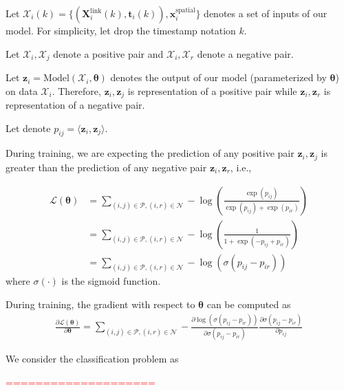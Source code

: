 Let $\mathcal{X}_i(k) = \{ (\mathbf{X}_i^\text{link}(k), \boldsymbol{t}_i(k)), \mathbf{x}_i^\text{spatial} \}$ denotes a set of inputs of our model. 
For simplicity, let drop the timestamp notation $k$.

Let $\mathcal{X}_i, \mathcal{X}_j$ denote a positive pair and $\mathcal{X}_i, \mathcal{X}_r$ denote a negative pair.

Let $\mathbf{z}_{i} = \text{Model}(\mathcal{X}_i, \boldsymbol{\theta})$ denotes the output of our model (parameterized by $\boldsymbol{\theta}$) on data $\mathcal{X}_i$. Therefore, $\mathbf{z}_i, \mathbf{z}_j$ is representation of a positive pair while $\mathbf{z}_i, \mathbf{z}_r$ is representation of a negative pair.



Let denote $p_{ij} = \langle \mathbf{z}_i, \mathbf{z}_j \rangle $.

During training, we are expecting the prediction of any positive pair $\mathbf{z}_i, \mathbf{z}_j$ is greater than the prediction of any negative pair $\mathbf{z}_i, \mathbf{z}_r$, i.e., 

\begin{equation}
    \begin{aligned}
    \mathcal{L}(\bm{\theta}) 
    &=  \sum_{(i,j)\in\mathcal{P}, (i,r) \in\mathcal{N}}  - \log\left(\frac{\exp(p_{ij})}{\exp(p_{ij}) + \exp(p_{ir})}\right) \\
    &= \sum_{(i,j)\in\mathcal{P}, (i,r) \in\mathcal{N}}  - \log\left(\frac{1}{1 + \exp(- p_{ij} + p_{ir})}\right) \\
    & = \sum_{(i,j)\in\mathcal{P}, (i,r) \in\mathcal{N}} - \log(\sigma(p_{ij}-p_{ir}))
    \end{aligned}
\end{equation}
where $\sigma(\cdot)$ is the sigmoid function.

During training, the gradient with respect to $\bm{\theta}$ can be computed as
\begin{equation}
    \begin{aligned}
    \frac{\partial \mathcal{L}(\bm{\theta})}{\partial \bm{\theta}} = \sum_{(i,j)\in\mathcal{P}, (i,r) \in\mathcal{N}} - \frac{\partial \log(\sigma(p_{ij}-p_{ir}))}{\partial \sigma(p_{ij}-p_{ir})}  \frac{\partial \sigma(p_{ij}-p_{ir})}{\partial p_{ij}}
    \end{aligned}
\end{equation}


We consider the classification problem as 


\clearpage
\textcolor{red}{====================\\}

